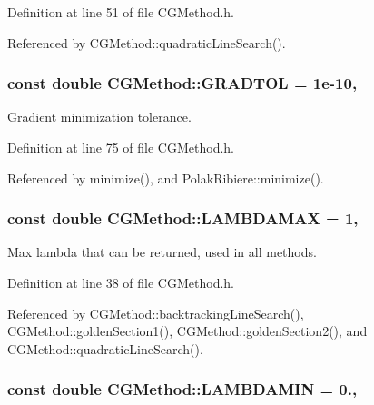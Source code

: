 Definition at line 51 of file C\+G\+Method.\+h.



Referenced by C\+G\+Method\+::quadratic\+Line\+Search().

\hypertarget{classCGMethod_ad0118dc4da7526f196a4b4172bba9625}{
\subsubsection[{G\+R\+A\+D\+T\+O\+L}]{\setlength{\rightskip}{0pt plus 5cm}const double C\+G\+Method\+::\+G\+R\+A\+D\+T\+O\+L = 1e-\/10\hspace{0.3cm}{\ttfamily [protected]}, {\ttfamily [inherited]}}}\label{classCGMethod_ad0118dc4da7526f196a4b4172bba9625}


Gradient minimization tolerance. 



Definition at line 75 of file C\+G\+Method.\+h.



Referenced by minimize(), and Polak\+Ribiere\+::minimize().

\hypertarget{classCGMethod_a04127fd877e82fdf4f71cd3709581419}{
\subsubsection[{L\+A\+M\+B\+D\+A\+M\+A\+X}]{\setlength{\rightskip}{0pt plus 5cm}const double C\+G\+Method\+::\+L\+A\+M\+B\+D\+A\+M\+A\+X = 1\hspace{0.3cm}{\ttfamily [protected]}, {\ttfamily [inherited]}}}\label{classCGMethod_a04127fd877e82fdf4f71cd3709581419}


Max lambda that can be returned, used in all methods. 



Definition at line 38 of file C\+G\+Method.\+h.



Referenced by C\+G\+Method\+::backtracking\+Line\+Search(), C\+G\+Method\+::golden\+Section1(), C\+G\+Method\+::golden\+Section2(), and C\+G\+Method\+::quadratic\+Line\+Search().

\hypertarget{classCGMethod_ae28b20ab18f9a0b7c6a1c443add1026e}{
\subsubsection[{L\+A\+M\+B\+D\+A\+M\+I\+N}]{\setlength{\rightskip}{0pt plus 5cm}const double C\+G\+Method\+::\+L\+A\+M\+B\+D\+A\+M\+I\+N = 0.\hspace{0.3cm}{\ttfamily [protected]}, {\ttfamily [inherited]}}}\label{classCGMethod_ae28b20ab18f9a0b7c6a1c443add1026e}


